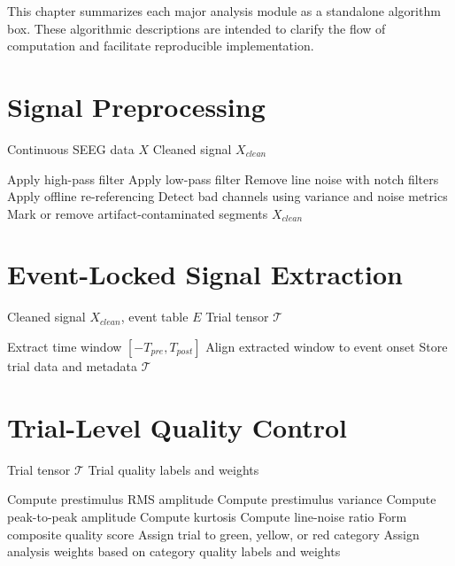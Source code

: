 \documentclass[11pt]{report}
\begin{document}
This chapter summarizes each major analysis module as a standalone
algorithm box. These algorithmic descriptions are intended to clarify
the flow of computation and facilitate reproducible implementation.

\section{Signal Preprocessing}

\begin{algorithm}[H]
\caption{Signal preprocessing}
\begin{algorithmic}[1]
\Require Continuous SEEG data $X$
\Ensure Cleaned signal $X_{clean}$

\State Apply high-pass filter
\State Apply low-pass filter
\State Remove line noise with notch filters
\State Apply offline re-referencing
\State Detect bad channels using variance and noise metrics
\State Mark or remove artifact-contaminated segments
\State \Return $X_{clean}$
\end{algorithmic}
\end{algorithm}

\section{Event-Locked Signal Extraction}

\begin{algorithm}[H]
\caption{Event-locked trial extraction}
\begin{algorithmic}[1]
\Require Cleaned signal $X_{clean}$, event table $E$
\Ensure Trial tensor $\mathcal{T}$

    \State Extract time window $[-T_{pre}, T_{post}]$
    \State Align extracted window to event onset
    \State Store trial data and metadata
\EndFor
\State \Return $\mathcal{T}$
\end{algorithmic}
\end{algorithm}

\section{Trial-Level Quality Control}

\begin{algorithm}[H]
\caption{Trial quality control}
\begin{algorithmic}[1]
\Require Trial tensor $\mathcal{T}$
\Ensure Trial quality labels and weights

    \State Compute prestimulus RMS amplitude
    \State Compute prestimulus variance
    \State Compute peak-to-peak amplitude
    \State Compute kurtosis
    \State Compute line-noise ratio
    \State Form composite quality score
    \State Assign trial to green, yellow, or red category
\EndFor
\State Assign analysis weights based on category
\State \Return quality labels and weights
\end{algorithmic}
\end{algorithm}
\end{document}
